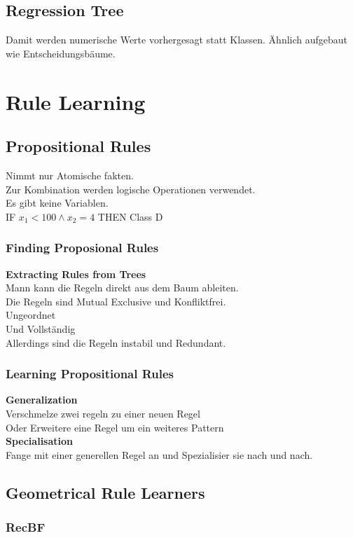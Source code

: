 \documentclass[a4paper]{scrartcl}
\begin{document}
 \subsection{Regression Tree}
 Damit werden numerische Werte vorhergesagt statt Klassen.
 Ähnlich aufgebaut wie Entscheidungsbäume.
 
 \section{Rule Learning}
 \subsection{Propositional Rules}
 Nimmt nur Atomische fakten.\\
 Zur Kombination werden logische Operationen verwendet.\\
 Es gibt keine Variablen.\\
 
 IF $x_1 < 100 \wedge x_2 = 4$ THEN Class D\\
 \subsubsection{Finding Proposional Rules}
 \textbf{Extracting Rules from Trees}\\
 Mann kann die Regeln direkt aus dem Baum ableiten.\\
 Die Regeln sind Mutual Exclusive und Konfliktfrei.\\
 Ungeordnet\\
 Und Vollständig\\
 Allerdings sind die Regeln instabil und Redundant.\\
 
 \subsubsection{Learning Propositional Rules}
 \textbf{Generalization}\\
 Verschmelze zwei regeln zu einer neuen Regel\\
 Oder Erweitere eine Regel um ein weiteres Pattern\\
 \textbf{Specialisation}\\
 Fange mit einer generellen Regel an und Spezialisier sie nach und nach.\\
 
 \subsection{Geometrical Rule Learners}
 \subsubsection{RecBF}
 
\end{document}
